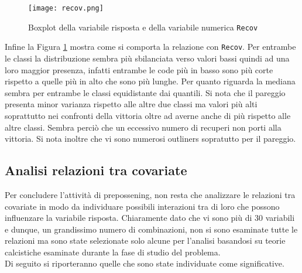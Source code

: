 \begin{figure}[htbp]
	\begin{center}
		\texttt{[image: recov.png]}
		\caption{Boxplot della variabile risposta e della variabile numerica \texttt{Recov}} \label{fig:recov}
	\end{center}
\end{figure} 

Infine la Figura \ref{fig:recov} mostra come si comporta la relazione con \texttt{Recov}. Per entrambe le classi la distribuzione sembra più sbilanciata verso valori bassi quindi ad una loro maggior presenza, infatti entrambe le code più in basso sono più corte rispetto a quelle più in alto che sono più lunghe. Per quanto riguarda la mediana sembra per entrambe le classi equidistante dai quantili. Si nota che il pareggio presenta minor varianza rispetto alle altre due classi ma valori più alti soprattutto nei confronti della vittoria oltre ad averne anche di più rispetto alle altre classi. Sembra perciò che un eccessivo numero di recuperi non porti alla vittoria. Si nota inoltre che vi sono numerosi outliners sopratutto per il pareggio.

\subsection{Analisi relazioni tra covariate} 
Per concludere l'attività di prepossening, non resta che analizzare le relazioni tra covariate in modo da individuare possibili interazioni tra di loro che possono influenzare la variabile risposta. Chiaramente dato che vi sono più di 30 variabili e dunque, un grandissimo numero di combinazioni, non si sono esaminate tutte le relazioni ma sono state selezionate solo alcune per l'analisi basandosi su teorie calcistiche esaminate durante la fase di studio del problema.\\
Di seguito si riporteranno quelle che sono state individuate come significative.\\

